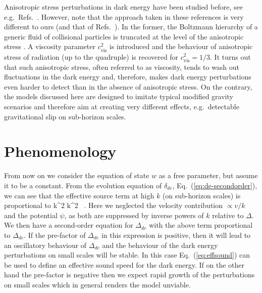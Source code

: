 Anisotropic stress perturbations in dark energy have been studied
before, see e.g.\ Refs.\ \cite{Koivisto:2005mm, Mota:2007sz,
Sapone:2012nh, Sapone:2013wda}. However, note that the approach taken
in these references is very different to ours (and that of Refs.\
\cite{Kunz:2006ca, Song:2010rm}). In the former, the Boltzmann hierarchy of a
generic fluid of collisional particles is truncated at the level of
the anisotropic stress \cite{Hu:1998kj}. A viscosity parameter
$c_\text{vis}^2$ is introduced and the behaviour of anisotropic stress
of radiation (up to the quadruple) is recovered for
$c_\text{vis}^2=1/3$. It turns out that such anisotropic stress, often
referred to as viscosity, tends to wash out fluctuations in the dark
energy and, therefore, makes dark energy perturbations even harder to
detect than in the absence of anisotropic stress. On the contrary, the
models discussed here are designed to imitate typical modified gravity
scenarios and therefore aim at creating very different effects, e.g.\
detectable gravitational slip on sub-horizon scales.

\section{Phenomenology}
\label{chapter-ade:phenomenology}

From now on we consider  the equation of state $w$ as a free parameter, but assume it to be a constant. From the evolution equation of $\delta_{de}$, Eq.\ (\ref{eq:de-secondorder}), we can see that the effective source term at high $k$ 
(on sub-horizon scales) is proportional to
\be
k^2 \left[ (1+w)\psi + \frac{\delta P_{de}}{\rho_{de}} -\frac{2}{3}\pi_{de} \right]
\approx  k^2  \, . \label{eq:effsound} \label{eq:pheno1} 
\ee
Here we neglected the velocity contribution $\propto v/k$ and the potential $\psi$, as both are suppressed by inverse powers of $k$
relative to $\Delta$. We then have a second-order equation for $\Delta_{de}$ with the above term proportional to $\Delta_{de}$. 
If the pre-factor of $\Delta_{de}$ in this expression is positive, then it will lead to an oscillatory behaviour of $\Delta_{de}$ and the behaviour of the dark energy perturbations on small scales will be stable. In this case Eq.\ (\ref{eq:effsound}) can be used to define an effective sound speed for the dark energy. If on the other hand the pre-factor is negative then we expect rapid growth of the perturbations on small scales which in general renders the model unviable. 

